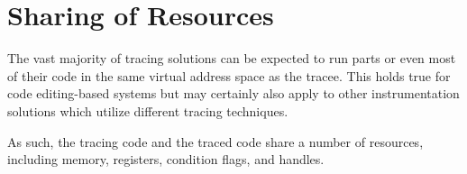		
%		
%		


\section{Sharing of Resources}
The vast majority of tracing solutions can be expected to run parts or even most
of their code in the same virtual address space as the tracee. This holds true for
code editing-based systems but may certainly also apply to other instrumentation 
solutions which utilize different tracing techniques.

As such, the tracing
code and the traced code share a number of resources, including memory, registers,
condition flags, and handles. 

